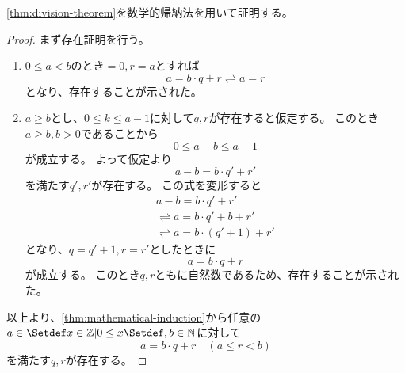 \documentclass[uplatex, 11pt, a4j, dvipdfmx]{jsarticle}
\begin{document}
    \cref{thm:division-theorem}を数学的帰納法を用いて証明する。
    \begin{proof}
      まず存在証明を行う。
      \begin{enumerate}
        \item $0 \leq a < b$のとき$ = 0, r = a$とすれば
          \begin{equation}
           a = b \cdot q + r \rightleftharpoons a = r
          \end{equation}
          となり、存在することが示された。
        \item $a \geq b$とし、$0 \leq k \leq a - 1$に対して$q, r$が存在すると仮定する。
              このとき$a \geq b, b > 0$であることから
              \begin{equation}
                0 \leq a - b \leq a - 1
              \end{equation}
              が成立する。
              よって仮定より
              \begin{equation}
                a - b = b \cdot q' + r'
              \end{equation}
              を満たす$q', r'$が存在する。
              この式を変形すると
              \begin{equation} \begin{aligned}
                a - b = b \cdot q' + r' \\
                \rightleftharpoons a = b \cdot q' + b + r' \\
                \rightleftharpoons a = b \cdot (q' + 1) + r'
              \end{aligned} \end{equation}
              となり、$q = q' + 1, r = r'$としたときに
              \begin{equation}
                a  = b \cdot q + r
              \end{equation}
              が成立する。
              このとき$q, r$ともに自然数であるため、存在することが示された。
      \end{enumerate}
      以上より、\cref{thm:mathematical-induction}から任意の$a \in \Set{ x \in \Z | 0 \leq x }, b \in \N$に対して
      \begin{equation}
        a = b \cdot q + r \quad (a \leq r < b)
      \end{equation}
      を満たす$q, r$が存在する。


\end{proof}
\end{document}
